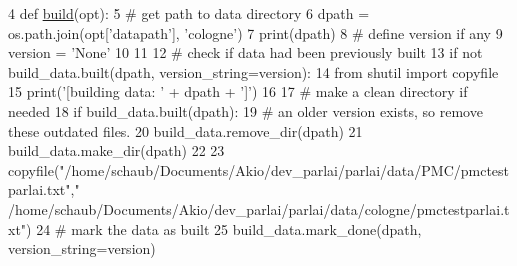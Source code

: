 \begin{DoxyCode}
4 \textcolor{keyword}{def }\hyperlink{namespacedialog__babi__feedback_1_1build_a7a9d289f7493a5ded13c4b7f071b6184}{build}(opt):
5     \textcolor{comment}{# get path to data directory}
6     dpath = os.path.join(opt[\textcolor{stringliteral}{'datapath'}], \textcolor{stringliteral}{'cologne'})
7     print(dpath)
8     \textcolor{comment}{# define version if any}
9     version = \textcolor{stringliteral}{'None'}
10 
11 
12     \textcolor{comment}{# check if data had been previously built}
13     \textcolor{keywordflow}{if} \textcolor{keywordflow}{not} build\_data.built(dpath, version\_string=version):
14         \textcolor{keyword}{from} shutil \textcolor{keyword}{import} copyfile
15         print(\textcolor{stringliteral}{'[building data: '} + dpath + \textcolor{stringliteral}{']'})
16 
17         \textcolor{comment}{# make a clean directory if needed}
18         \textcolor{keywordflow}{if} build\_data.built(dpath):
19             \textcolor{comment}{# an older version exists, so remove these outdated files.}
20             build\_data.remove\_dir(dpath)
21         build\_data.make\_dir(dpath)
22 
23         copyfile(\textcolor{stringliteral}{"/home/schaub/Documents/Akio/dev\_parlai/parlai/data/PMC/pmctestparlai.txt"},\textcolor{stringliteral}{"
      /home/schaub/Documents/Akio/dev\_parlai/parlai/data/cologne/pmctestparlai.txt"})
24         \textcolor{comment}{# mark the data as built}
25         build\_data.mark\_done(dpath, version\_string=version)
\end{DoxyCode}
